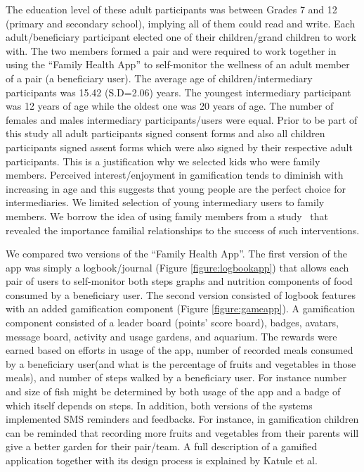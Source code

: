 \documentclass{sig-alternate}
\begin{document}
The education level of these adult participants was between Grades 7 and 12 (primary and secondary school), implying all of them could read and write. Each adult/beneficiary participant  elected one of their children/grand children to work with. The two members formed a pair and were required to work together in using the ``Family Health App'' to self-monitor the wellness of an adult member of a pair (a beneficiary user). The average age of children/intermediary participants was 15.42 (S.D=2.06) years. The youngest intermediary participant was 12 years of age while the oldest one was 20 years of age. The number of females and males intermediary participants/users were equal. Prior to be part of this study all adult participants signed consent forms and also all children participants signed assent forms which were also signed by their respective adult participants. This is a justification why we selected kids who were family members. Perceived interest/enjoyment in gamification tends to diminish with increasing in age \cite{v2014motivational} and this suggests that young people are the perfect choice for intermediaries. We limited selection of young intermediary users to family members. We borrow the idea of using family members from a study~\cite{katule2016:leveraging} that revealed the importance familial relationships to the success of such interventions. 

We compared two versions of the ``Family Health App''. The first version of the app was simply a logbook/journal (Figure \ref{figure:logbookapp}) that allows each pair of users to self-monitor both steps graphs and nutrition components of food consumed by a beneficiary user. The second version consisted of logbook features with an added gamification component (Figure \ref{figure:gameapp}). A gamification component consisted of a leader board (points' score board), badges, avatars, message board, activity and usage gardens, and aquarium. The rewards were earned based on efforts in usage of the app, number of recorded meals consumed by a beneficiary user(and what is the percentage of fruits and vegetables in those meals), and number of steps walked by a beneficiary user. For instance  number and size of fish might be determined by both usage of the app and a badge of which itself depends on steps.  In addition, both versions of the systems implemented SMS reminders and feedbacks. For instance, in gamification children can be reminded that recording more fruits and vegetables from their parents will give a better garden for their pair/team. A full description of a gamified application together with its design process is explained by Katule et al.~\cite{katule2016:leveraging}
\end{document}
